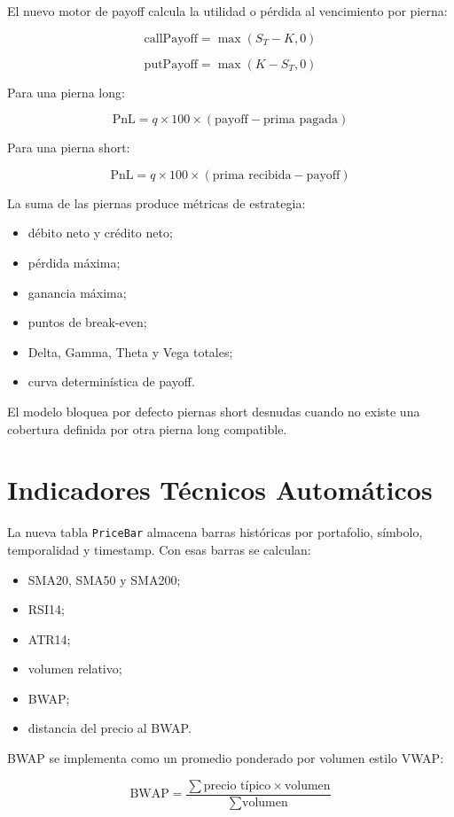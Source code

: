 \documentclass[11pt,letterpaper]{article}
\begin{document}
El nuevo motor de payoff calcula la utilidad o pérdida al vencimiento por pierna:

\[
\text{callPayoff} = \max(S_T - K, 0)
\]

\[
\text{putPayoff} = \max(K - S_T, 0)
\]

Para una pierna long:

\[
\text{PnL} = q \times 100 \times (\text{payoff} - \text{prima pagada})
\]

Para una pierna short:

\[
\text{PnL} = q \times 100 \times (\text{prima recibida} - \text{payoff})
\]

La suma de las piernas produce métricas de estrategia:

\begin{itemize}
  \item débito neto y crédito neto;
  \item pérdida máxima;
  \item ganancia máxima;
  \item puntos de break-even;
  \item Delta, Gamma, Theta y Vega totales;
  \item curva determinística de payoff.
\end{itemize}

El modelo bloquea por defecto piernas short desnudas cuando no existe una cobertura definida por otra pierna long compatible.

\section{Indicadores Técnicos Automáticos}

La nueva tabla \texttt{PriceBar} almacena barras históricas por portafolio, símbolo, temporalidad y timestamp. Con esas barras se calculan:

\begin{itemize}
  \item SMA20, SMA50 y SMA200;
  \item RSI14;
  \item ATR14;
  \item volumen relativo;
  \item BWAP;
  \item distancia del precio al BWAP.
\end{itemize}

BWAP se implementa como un promedio ponderado por volumen estilo VWAP:

\[
\text{BWAP} =
\frac{\sum \text{precio típico} \times \text{volumen}}
{\sum \text{volumen}}
\]
\end{document}
